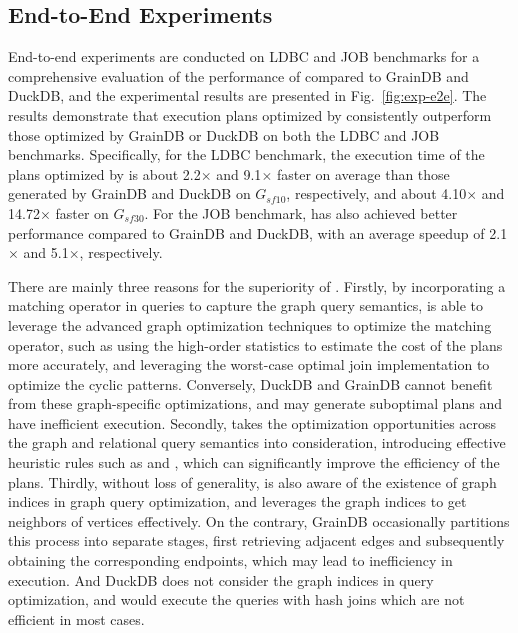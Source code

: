 \subsection{End-to-End Experiments}
\label{sec:experiment-e2e}

End-to-end experiments are conducted on LDBC and JOB benchmarks for a comprehensive evaluation of the performance of \name compared to GrainDB and DuckDB,
and the experimental results are presented in Fig.~\ref{fig:exp-e2e}.
The results demonstrate that execution plans optimized by \name consistently outperform those optimized by GrainDB or DuckDB on both the LDBC and JOB benchmarks.
Specifically, for the LDBC benchmark, the execution time of the plans optimized by \name is about 2.2$\times$ and 9.1$\times$ faster on average than those generated by GrainDB and DuckDB on $G_{sf10}$, respectively, and about 4.10$\times$ and 14.72$\times$ faster on $G_{sf30}$.
For the JOB benchmark, \name has also achieved better performance compared to GrainDB and DuckDB, with an average speedup of 2.1$\times$ and 5.1$\times$, respectively.

There are mainly three reasons for the superiority of \name.
Firstly, by incorporating a matching operator in \spjm queries to capture the graph query semantics, \name is able to leverage the advanced graph optimization techniques to optimize the matching operator, such as using the high-order statistics to estimate the cost of the plans more accurately, and leveraging the worst-case optimal join implementation to optimize the cyclic patterns.
Conversely, DuckDB and GrainDB cannot benefit from these graph-specific optimizations, and may generate suboptimal plans and have inefficient execution.
Secondly, \name takes the optimization opportunities across the graph and relational query semantics into consideration, introducing effective heuristic rules such as \filterrule and \joinfuserule, which can significantly improve the efficiency of the plans.
Thirdly, without loss of generality, \name is also aware of the existence of graph indices in graph query optimization, and leverages the graph indices to get neighbors of vertices effectively.
On the contrary, GrainDB occasionally partitions this process into separate stages, first retrieving adjacent edges and subsequently obtaining the corresponding endpoints, which may lead to inefficiency in execution. And DuckDB does not consider the graph indices in query optimization, and would execute the queries with hash joins which are not efficient in most cases.

